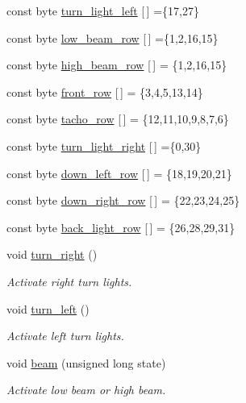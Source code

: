 \begin{DoxyCompactItemize}
\item 
const byte \hyperlink{group__car_gac03fd0ab9cbcc53730039ad03e9b094d}{turn\+\_\+light\+\_\+left} \mbox{[}$\,$\mbox{]} =\{17,27\}
\item 
const byte \hyperlink{group__car_ga1a25903a2850d9849775664473070489}{low\+\_\+beam\+\_\+row} \mbox{[}$\,$\mbox{]} =\{1,2,16,15\}
\item 
const byte \hyperlink{group__car_ga1ecea646e1c5dcdfc643287a5f2041bb}{high\+\_\+beam\+\_\+row} \mbox{[}$\,$\mbox{]} = \{1,2,16,15\}
\item 
const byte \hyperlink{group__car_ga5009aa0cbe6b32a72b085489b027800e}{front\+\_\+row} \mbox{[}$\,$\mbox{]} = \{3,4,5,13,14\}
\item 
const byte \hyperlink{group__car_ga6ade605406f4c1ce9f03a5a2530f6dbe}{tacho\+\_\+row} \mbox{[}$\,$\mbox{]} = \{12,11,10,9,8,7,6\}
\item 
const byte \hyperlink{group__car_gaa5a6ee27fdf1d7c939cdf2a7266d7e84}{turn\+\_\+light\+\_\+right} \mbox{[}$\,$\mbox{]} =\{0,30\}
\item 
const byte \hyperlink{group__car_gaac36c9836edd3a125668213f0fb72b5a}{down\+\_\+left\+\_\+row} \mbox{[}$\,$\mbox{]} = \{18,19,20,21\}
\item 
const byte \hyperlink{group__car_gadbf10ff9ee353128c568e07c32b1ffa9}{down\+\_\+right\+\_\+row} \mbox{[}$\,$\mbox{]} = \{22,23,24,25\}
\item 
const byte \hyperlink{group__car_ga516415cfaebc59b71f822fb4cf86b22c}{back\+\_\+light\+\_\+row} \mbox{[}$\,$\mbox{]} = \{26,28,29,31\}
\item 
void \hyperlink{group__car_gaca3b725ebee32d3719a9c02b41002ea3}{turn\+\_\+right} ()
\begin{DoxyCompactList}\small\item\em Activate right turn lights. \end{DoxyCompactList}\item 
void \hyperlink{group__car_ga0565ad7a822d9d334bb50c088af22361}{turn\+\_\+left} ()
\begin{DoxyCompactList}\small\item\em Activate left turn lights. \end{DoxyCompactList}\item 
void \hyperlink{group__car_ga6b1fd674445dd1c654dfe8b8b65f168e}{beam} (unsigned long state)
\begin{DoxyCompactList}\small\item\em Activate low beam or high beam. \end{DoxyCompactList}\item 

\end{DoxyCompactItemize}
